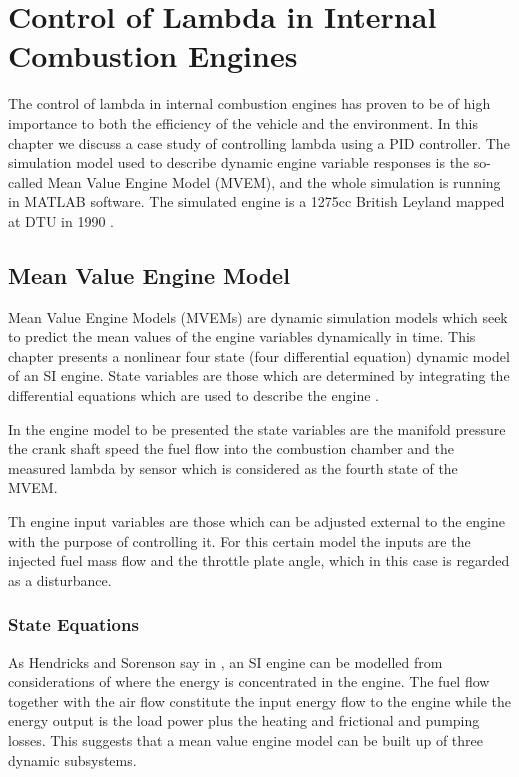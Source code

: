 \chapter{Control of Lambda in Internal Combustion Engines}\label{ch:4}

The control of lambda in internal combustion engines has proven to be of high importance to both the efficiency of the vehicle and the environment. In this chapter we discuss a case study of controlling lambda using a PID controller. The  simulation model used to describe dynamic engine variable responses is the so-called Mean Value Engine Model (MVEM), and the whole simulation is running in MATLAB software. The simulated engine is a 1275cc British Leyland mapped at DTU in 1990 \cite{dtu}.  

\section{Mean Value Engine Model}

Mean Value Engine Models (MVEMs) are dynamic simulation models which seek to predict the mean values of the engine variables dynamically in time. This chapter presents a nonlinear four state (four differential equation) dynamic model of an SI engine. State variables are those which are determined by integrating the differential equations which are used to describe the engine \cite{hendricks1990mean}. 

In the engine model to be presented the state variables are the manifold pressure the crank shaft speed the fuel flow into the combustion chamber and the measured lambda by sensor which is considered as the fourth state of the MVEM.

Th engine input variables are those which can be adjusted external to the engine with the purpose of controlling it. For this certain model the inputs are the injected fuel mass flow and the throttle plate angle, which in this case is regarded as a disturbance. 

\subsection{State Equations}

As Hendricks and Sorenson say in \cite{hendricks1990mean}, an SI engine can be modelled from considerations of where the energy is concentrated in the engine. The fuel flow together with the air flow constitute the input energy flow to the engine while the energy output is the load power plus the heating and frictional and pumping losses. This suggests that a mean value engine model can be built up of three dynamic subsystems. 


